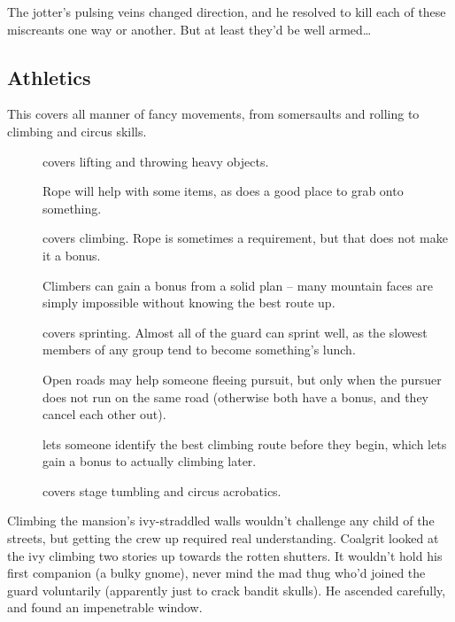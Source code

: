 \begin{multicols}{2}
\begin{exampletext}
  The \gls{jotter}'s pulsing veins changed direction, and he resolved to kill each of these miscreants one way or another.
  But at least they'd be well armed\ldots
\end{exampletext}

\subsection{Athletics}

This covers all manner of fancy movements, from somersaults and rolling to climbing and circus skills.


\begin{description}
  \item[]
    covers lifting and throwing heavy objects.

    Rope will help with some items, as does a good place to grab onto something.
  \item[]
    covers climbing.
    Rope is sometimes a requirement, but that does not make it a bonus.

    Climbers can gain a bonus from a solid plan -- many mountain faces are simply impossible without knowing the best route up.
  \item[]
    covers sprinting.
    Almost all of the \gls{guard} can sprint well, as the slowest members of any group tend to become something's lunch.

    Open roads may help someone fleeing pursuit, but only when the pursuer does not run on the same road (otherwise both have a bonus, and they cancel each other out).
  \item[]
    lets someone identify the best climbing route before they begin, which lets gain a bonus to actually climbing later.
  \item[]
    covers stage tumbling and circus acrobatics.
\end{description}

\begin{exampletext}
  Climbing the mansion's ivy-straddled walls wouldn't challenge any child of the streets, but getting the crew up required real understanding.
  Coalgrit looked at the ivy climbing two stories up towards the rotten shutters.
  It wouldn't hold his first companion (a bulky gnome), never mind the mad thug who'd joined the \gls{guard} voluntarily (apparently just to crack bandit skulls).
  He ascended carefully, and found an impenetrable window.


\end{exampletext}
\end{multicols}

